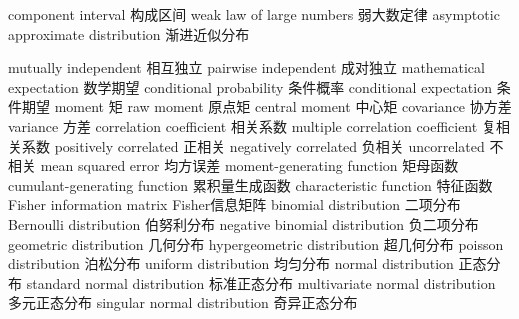 {component interval} 
{构成区间}
{weak law of large numbers} 
{弱大数定律}
{asymptotic approximate distribution} 
{渐进近似分布}



{mutually independent} 
{相互独立}
{pairwise independent} 
{成对独立}
{mathematical expectation} 
{数学期望}
{conditional probability} 
{条件概率}
{conditional expectation} 
{条件期望}
{moment} 
{矩}
{raw moment} 
{原点矩}
{central moment} 
{中心矩}
{covariance} 
{协方差}
{variance} 
{方差}
{correlation coefficient} 
{相关系数}
{multiple correlation coefficient} 
{复相关系数}
{positively correlated} 
{正相关}
{negatively correlated} 
{负相关}
{uncorrelated} 
{不相关}
{mean squared error} 
{均方误差}
{moment-generating function} 
{矩母函数}
{cumulant-generating function} 
{累积量生成函数}
{characteristic function} 
{特征函数}
{Fisher information matrix} 
{Fisher信息矩阵}
{binomial distribution} 
{二项分布}
{Bernoulli distribution} 
{伯努利分布}
{negative binomial distribution} 
{负二项分布}
{geometric distribution} 
{几何分布}
{hypergeometric distribution} 
{超几何分布}
{poisson distribution} 
{泊松分布}
{uniform distribution} 
{均匀分布}
{normal distribution} 
{正态分布}
{standard normal distribution} 
{标准正态分布}
{multivariate normal distribution} 
{多元正态分布}
{singular normal distribution} 
{奇异正态分布}

